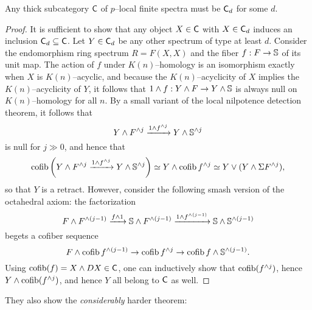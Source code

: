 \begin{theorem}
Any thick subcategory $\CatOf C$ of $p$--local finite spectra must be $\CatOf C_d$ for some $d$.
\end{theorem}
\begin{proof}
It is sufficient to show that any object $X \in \CatOf C$ with $X \in \CatOf C_d$ induces an inclusion $\CatOf C_d \subseteq \CatOf C$.
Let $Y \in \CatOf C_d$ be any other spectrum of type at least $d$.  Consider the endomorphism ring spectrum $R = F(X, X)$ and the fiber $f: F \to \S$ of its unit map.  The action of $f$ under $K(n)$--homology is an isomorphism exactly when $X$ is $K(n)$--acyclic, and because the $K(n)$--acyclicity of $X$ implies the $K(n)$--acyclicity of $Y$, it follows that $1 \sm f: Y \sm F \to Y \sm \S$ is always null on $K(n)$--homology for all $n$.  By a small variant of the local nilpotence detection theorem, it follows that \[Y \sm F^{\sm j} \xrightarrow{1 \sm f^{\sm j}} Y \sm \S^{\sm j}\] is null for $j \gg 0$, and hence that \[\operatorname{cofib}\left( Y \sm F^{\sm j} \xrightarrow{1 \sm f^{\sm j}} Y \sm \S^{\sm j} \right) \simeq Y \sm \operatorname{cofib} f^{\sm j} \simeq Y \vee (Y \sm \Susp F^{\sm j}),\] so that $Y$ is a retract.  However, consider the following smash version of the octahedral axiom: the factorization \[F \sm F^{\sm (j-1)} \xrightarrow{f \sm 1} \S \sm F^{\sm (j-1)} \xrightarrow{1 \sm f^{\sm (j-1)}} \S \sm \S^{\sm (j-1)}\] begets a cofiber sequence \[F \sm \operatorname{cofib} f^{\sm (j-1)} \to \operatorname{cofib} f^{\sm j} \to \operatorname{cofib} f \sm \S^{\sm (j-1)}.\]
Using $\operatorname{cofib}(f) = X \sm DX \in \CatOf C$, one can inductively show that $\operatorname{cofib}(f^{\sm j})$, hence $Y \sm \operatorname{cofib}(f^{\sm j})$, and hence $Y$ all belong to $\CatOf C$ as well.
\end{proof}

They also show the \emph{considerably} harder theorem:

